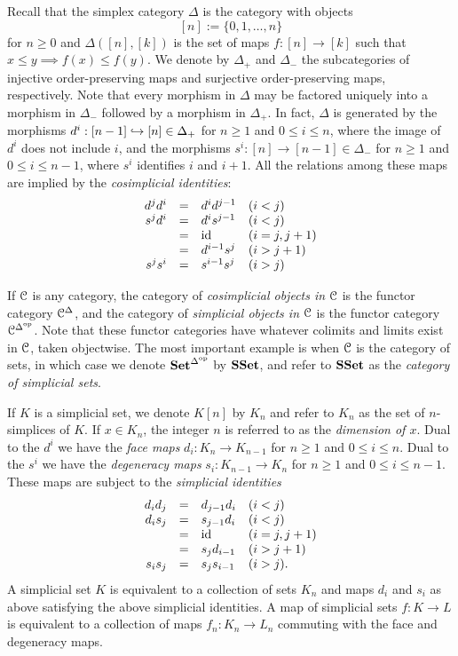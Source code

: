 \documentclass[../main.tex]{subfiles}
\begin{document}
Recall that the simplex category $\Delta$ is the category with objects
\[[n]:=\{0,1,\ldots,n\}\]
for $n\geq0$ and $\Delta([n],[k])$ is the set of maps $f:[n]\to[k]$ such that $x\leq y\implies f(x)\leq f(y)$. We denote by $\Delta_+$ and $\Delta_-$ the subcategories of injective order-preserving maps and surjective order-preserving maps, respectively. Note that every morphism in $\Delta$ may be factored uniquely into a morphism in $\Delta_-$ followed by a morphism in $\Delta_+$. In fact, $\Delta$ is generated by the morphisms $d^i:[n-1]\hookrightarrow[n]\in\Delta_+$ for $n\geq1$ and $0\leq i\leq n$, where the image of $d^i$ does not include $i$, and the morphisms $s^i:[n]\to[n-1]\in\Delta_-$ for $n\geq1$ and $0\leq i\leq n-1$, where $s^i$ identifies $i$ and $i+1$. All the relations among these maps are implied by the \textit{cosimplicial identities}:
\[
  \begin{array}{rcll}
    d^jd^i & = & d^id^{j-1} & (i<j) \\
    s^jd^i & = & d^is^{j-1} & (i<j) \\
    & = & \mathrm{id} & (i=j,j+1) \\
    & = & d^{i-1}s^j & (i>j+1) \\
    s^js^i & = & s^{i-1}s^j & (i>j)
  \end{array}
\]

If $\mathcal C$ is any category, the category of \textit{cosimplicial objects in $\mathcal C$} is the functor category $\mathcal C^\Delta$, and the category of \textit{simplicial objects in $\mathcal C$} is the functor category $\mathcal C^{\Delta^{\mathrm{op}}}$. Note that these functor categories have whatever colimits and limits exist in $\mathcal C$, taken objectwise. The most important example is when $\mathcal C$ is the category of sets, in which case we denote $\mathbf{Set}^{\Delta^{\mathrm{op}}}$ by $\mathbf{SSet}$, and refer to $\mathbf{SSet}$ as the \textit{category of simplicial sets}.

If $K$ is a simplicial set, we denote $K[n]$ by $K_n$ and refer to $K_n$ as the set of $n$-simplices of $K$. If $x\in K_n$, the integer $n$ is referred to as the \textit{dimension of $x$}. Dual to the $d^i$ we have the \textit{face maps} $d_i:K_n\to K_{n-1}$ for $n\geq1$ and $0\leq i\leq n$. Dual to the $s^i$ we have the \textit{degeneracy maps} $s_i:K_{n-1}\to K_n$ for $n\geq1$ and $0\leq i\leq n-1$. These maps are subject to the \textit{simplicial identities}
\[
  \begin{array}{rcll}
    d_id_j & = & d_{j-1}d_i & (i<j) \\
    d_is_j & = & s_{j-1}d_i & (i<j) \\
    & = & \mathrm{id} & (i=j,j+1) \\
    & = & s_jd_{i-1} & (i>j+1) \\
    s_is_j & = & s_{j}s_{i-1} & (i>j).
  \end{array}
\]
A simplicial set $K$ is equivalent to a collection of sets $K_n$ and maps $d_i$ and $s_i$ as above satisfying the above simplicial identities. A map of simplicial sets $f:K\to L$ is equivalent to a collection of maps $f_n:K_n\to L_n$ commuting with the face and degeneracy maps.
\end{document}
